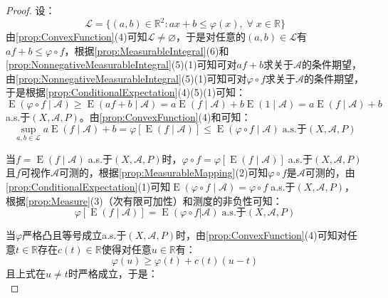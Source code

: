 \begin{proof}
	设：
	\begin{equation*}
		\mathcal{L}=\{(a,b)\in\mathbb{R}^{2}:ax+b\leqslant\varphi(x),\;\forall\;x\in\mathbb{R}\}
	\end{equation*}
	由\cref{prop:ConvexFunction}(4)可知$\mathcal{L}\ne\varnothing$，于是对任意的$(a,b)\in\mathcal{L}$有$af+b\leqslant\varphi\circ f$，根据\cref{prop:MeasurableIntegral}(6)和\cref{prop:NonnegativeMeasurableIntegral}(5)(1)可知可对$af+b$求关于$\mathscr{A}$的条件期望，由\cref{prop:NonnegativeMeasurableIntegral}(5)(1)可知可对$\varphi\circ f$求关于$\mathscr{A}$的条件期望，于是根据\cref{prop:ConditionalExpectation}(4)(5)(1)可知：
	\begin{equation*}
		\operatorname{E}(\varphi\circ f\mid\mathscr{A})\geqslant\operatorname{E}(af+b\mid\mathscr{A})=a\operatorname{E}(f\mid\mathscr{A})+b\operatorname{E}(1\mid\mathscr{A})=a\operatorname{E}(f\mid\mathscr{A})+b
	\end{equation*}
	a.s.于$(X,\mathscr{A},P)$。由\cref{prop:ConvexFunction}(4)和可知：
	\begin{equation*}
		\sup_{a,b\in\mathcal{L}}a\operatorname{E}(f\mid\mathscr{A})+b=\varphi[\operatorname{E}(f\mid\mathscr{A})]\leqslant\operatorname{E}(\varphi\circ f\mid\mathscr{A})\;\text{a.s.于}(X,\mathscr{A},P)
	\end{equation*}\par
	当$f=\operatorname{E}(f\mid\mathscr{A})\;$a.s.于$(X,\mathscr{A},P)$时，$\varphi\circ f=\varphi[\operatorname{E}(f\mid\mathscr{A})]\;$a.s.于$(X,\mathscr{A},P)$且$f$可视作$\mathscr{A}$可测的，根据\cref{prop:MeasurableMapping}(2)可知$\varphi\circ f$是$\mathscr{A}$可测的，由\cref{prop:ConditionalExpectation}(1)可知$\operatorname{E}(\varphi\circ f\mid\mathscr{A})=\varphi\circ f\;$a.s.于$(X,\mathscr{A},P)$，根据\cref{prop:Measure}(3)（次有限可加性）和测度的非负性可知：
	\begin{equation*}
		\varphi[\operatorname{E}(f\mid\mathscr{A})]=\operatorname{E}(\varphi\circ f|\mathscr{A})\;\text{a.s.于}(X,\mathscr{A},P)
	\end{equation*}\par
	当$\varphi$严格凸且等号成立a.s.于$(X,\mathscr{A},P)$时，由\cref{prop:ConvexFunction}(4)可知对任意$t\in\mathbb{R}$存在$c(t)\in\mathbb{R}$使得对任意$u\in\mathbb{R}$有：
	\begin{equation*}
		\varphi(u)\geqslant\varphi(t)+c(t)(u-t)
	\end{equation*}
	且上式在$u\neq t$时严格成立，于是：
	\begin{equation*}

\end{equation*}
\end{proof}
